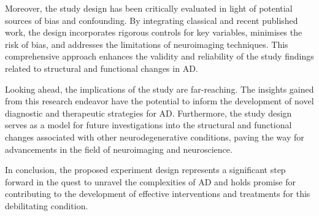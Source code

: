\documentclass[10pt]{article}
\begin{document}
\begin{sloppypar}
  Moreover, the study design has been critically evaluated in light of potential sources of bias and confounding. By integrating classical and recent published work, the design incorporates rigorous controls for key variables, minimises the risk of bias, and addresses the limitations of neuroimaging techniques. This comprehensive approach enhances the validity and reliability of the study findings related to structural and functional changes in AD.

  Looking ahead, the implications of the study are far-reaching. The insights gained from this research endeavor have the potential to inform the development of novel diagnostic and therapeutic strategies for AD. Furthermore, the study design serves as a model for future investigations into the structural and functional changes associated with other neurodegenerative conditions, paving the way for advancements in the field of neuroimaging and neuroscience.

  In conclusion, the proposed experiment design represents a significant step forward in the quest to unravel the complexities of AD and holds promise for contributing to the development of effective interventions and treatments for this debilitating condition.

  \pagebreak
  \singlespacing %
  
  

\end{sloppypar}
\end{document}
